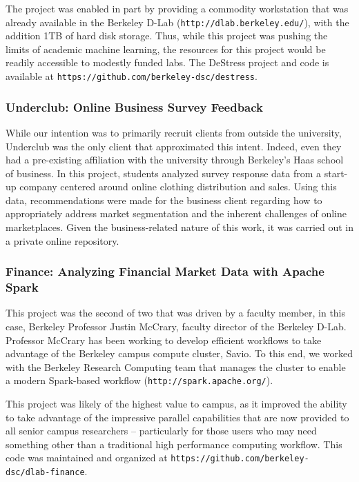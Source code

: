 \documentclass[12pt]{article}
\begin{document}
The project was enabled in part by providing a commodity workstation that was already available in the Berkeley D-Lab (\texttt{http://dlab.berkeley.edu/}), with the addition 1TB of hard disk storage. Thus, while this project was pushing the limits of academic machine learning, the resources for this project would be readily accessible to modestly funded labs.  The DeStress project and code is available at \texttt{https://github.com/berkeley-dsc/destress}.

\subsubsection*{Underclub: Online Business Survey Feedback}

While our intention was to primarily recruit clients from outside the university, Underclub was the only client that approximated this intent. Indeed, even they had a pre-existing affiliation with the university through Berkeley's Haas school of business.  In this project, students analyzed survey response data from a start-up company centered around online clothing distribution and sales.  Using this data, recommendations were made for the business client regarding how to appropriately address market segmentation and the inherent challenges of online marketplaces.  Given the business-related nature of this work, it was carried out in a private online repository.

\subsubsection*{Finance: Analyzing Financial Market Data with Apache Spark}

This project was the second of two that was driven by a faculty member, in this case, Berkeley Professor Justin McCrary, faculty director of the Berkeley D-Lab. Professor McCrary has been working to develop efficient workflows to take advantage of the Berkeley campus compute cluster, Savio. To this end, we worked with the Berkeley Research Computing team that manages the cluster to enable a modern Spark-based workflow (\texttt{http://spark.apache.org/}).

This project was likely of the highest value to campus, as it improved the ability to take advantage of the impressive parallel capabilities that are now provided to all senior campus researchers -- particularly for those users who may need something other than a traditional high performance computing workflow. This code was maintained and organized at \texttt{https://github.com/berkeley-dsc/dlab-finance}.
\end{document}

